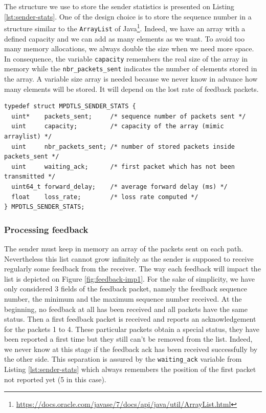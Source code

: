 The structure we use to store the sender statistics is presented on Listing \ref{lst:sender-stats}. One of the design choice is to store the sequence number in a structure similar to the \texttt{ArrayList} of Java\footnote{\url{https://docs.oracle.com/javase/7/docs/api/java/util/ArrayList.html}}. Indeed, we have an array with a defined capacity and we can add as many elements as we want. To avoid too many memory allocations, we always double the size when we need more space. In consequence, the variable \texttt{capacity} remembers the real size of the array in memory while the \texttt{nbr\_packets\_sent} indicates the number of elements stored in the array. A variable size array is needed because we never know in advance how many elements will be stored. It will depend on the lost rate of feedback packets.

\begin{lstlisting}[caption=Sender structure to store statistics, label=lst:sender-stats]
typedef struct MPDTLS_SENDER_STATS {
  uint*    packets_sent;     /* sequence number of packets sent */
  uint     capacity;         /* capacity of the array (mimic arraylist) */
  uint     nbr_packets_sent; /* number of stored packets inside packets_sent */
  uint     waiting_ack;      /* first packet which has not been transmitted */
  uint64_t forward_delay;    /* average forward delay (ms) */
  float    loss_rate;        /* loss rate computed */
} MPDTLS_SENDER_STATS;
\end{lstlisting}

\subsubsection{Processing feedback}

The sender must keep in memory an array of the packets sent on each path. Nevertheless this list cannot grow infinitely as the sender is supposed to receive regularly some feedback from the receiver. The way each feedback will impact the list is depicted on Figure \ref{fig:feedback-imp1}. For the sake of simplicity, we have only considered 3 fields of the feedback packet, namely the feedback sequence number, the minimum and the maximum sequence number received. At the beginning, no feedback at all has been received and all packets have the same status. Then a first feedback packet is received and reports an acknowledgement for the packets 1 to 4. These particular packets obtain a special status, they have been reported a first time but they still can't be removed from the list. Indeed, we never know at this stage if the feedback ack has been received successfully by the other side. This separation is assured by the \texttt{waiting\_ack} variable from Listing \ref{lst:sender-stats} which always remembers the position of the first packet not reported yet (5 in this case). 

